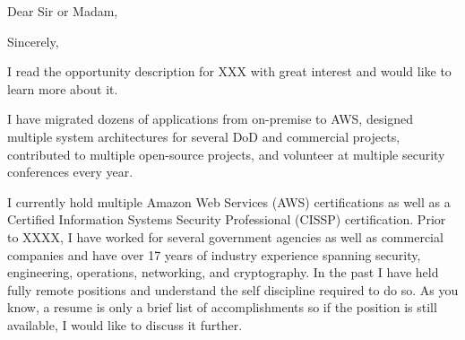 \thispagestyle{empty}
\opening{Dear Sir or Madam,}
\closing{Sincerely,}
\makelettertitle

I read the opportunity description for XXX with great interest and would like to learn more about it.

I have migrated dozens of applications from on-premise to AWS, designed multiple system architectures for several DoD and commercial projects, contributed to multiple open-source projects, and volunteer at multiple security conferences every year.

I currently hold multiple Amazon Web Services (AWS) certifications as well as a Certified Information Systems Security Professional (CISSP) certification.  Prior to XXXX, I have worked for several government agencies as well as commercial companies and have over 17 years of industry experience spanning security, engineering, operations, networking, and cryptography.  In the past I have held fully remote positions and understand the self discipline required to do so.
As you know, a resume is only a brief list of accomplishments so if the position is still available, I would like to discuss it further.

\makeletterclosing
\clearpage
\setcounter{page}{1}
